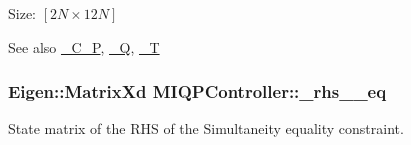 \-Size\-: $[2N\times12N]$

\begin{DoxySeeAlso}{\-See also}
\hyperlink{classMIQPController_a17cf6f8279cf6b2ce333feb9c8fc5a5d}{\-\_\-\-C\-\_\-\-P}, \hyperlink{classMIQPController_ac6404f74d6002d6a0ca4bd2d0b41d548}{\-\_\-\-Q}, \hyperlink{classMIQPController_a1143455ae85d0e221578dbe5d659af1d}{\-\_\-\-T} 
\end{DoxySeeAlso}
\hypertarget{classMIQPController_aa8e6df5286125975521b77501e792413}{
\subsubsection[{\-\_\-rhs\-\_\-2\-\_\-eq}]{\setlength{\rightskip}{0pt plus 5cm}\-Eigen\-::\-Matrix\-Xd {\bf \-M\-I\-Q\-P\-Controller\-::\-\_\-rhs\-\_\-\_\-eq}}}\label{classMIQPController_aa8e6df5286125975521b77501e792413}
\-State matrix of the \-R\-H\-S of the \-Simultaneity equality constraint.

